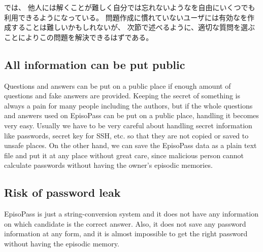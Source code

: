\documentclass{article}
\begin{document}
%
%

{\EP}では、
他人には解くことが難しく自分では忘れないような{\SQ}を自由にいくつでも利用できるようになっている。
問題作成に慣れていないユーザには有効な{\SQ}を作成することは難しいかもしれないが、
次節で述べるように、適切な質問を選ぶことによりこの問題を解決できるはずである。

\subsection{All information can be put public}

Questions and answers can be put on a public place
if enough amount of questions and fake answers are provided.
%
Keeping the secret of something is always a pain for many people including
the authors, but if the whole questions and answers used on EpisoPass
can be put on a public place,
handling it becomes very easy.
Usually we have to be very careful about handling
secret information like passwords, secret key for SSH, etc.
so that they are not copied or saved to unsafe places.
On the other hand,
we can save the EpisoPass data as a plain text file and put it at
any place without great care, since malicious person cannot calculate
passwords without having the owner's episodic memories.


\subsection{Risk of password leak}

EpisoPass is just a string-conversion system and it does not
have any information on which candidate is the correct answer.
Also, it does not save any password information at any form, and
it is almost impossible to get the right password 
without having the episodic memory.

\end{document}
